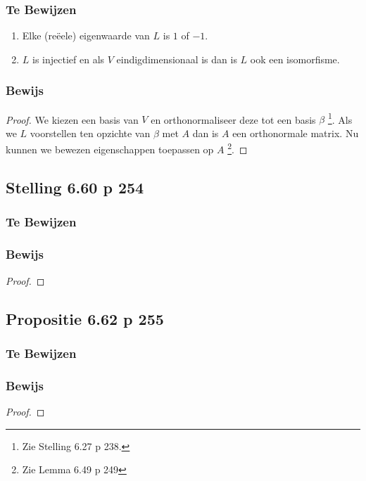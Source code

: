 \documentclass[lineaire_algebra_oplossingen.tex]{subfiles}
\begin{document}
\subsubsection*{Te Bewijzen}
\begin{enumerate}
\item Elke (re\"eele) eigenwaarde van $L$ is $1$ of $-1$.
\item $L$ is injectief en als $V$ eindigdimensionaal is dan is $L$ ook een isomorfisme.
\end{enumerate}
\subsubsection*{Bewijs}
\begin{proof}
We kiezen een basis van $V$ en orthonormaliseer deze tot een basis $\beta$ \footnote{Zie Stelling 6.27 p 238.}. Als we $L$ voorstellen ten opzichte van $\beta$ met $A$ dan is $A$ een orthonormale matrix.
Nu kunnen we bewezen eigenschappen toepassen op $A$ \footnote{Zie Lemma 6.49 p 249}.
\end{proof}

\subsection{Stelling 6.60 p 254}
\subsubsection*{Te Bewijzen}
\subsubsection*{Bewijs}
\begin{proof}

\end{proof}

\subsection{Propositie 6.62 p 255}
\subsubsection*{Te Bewijzen}
\subsubsection*{Bewijs}
\begin{proof}

\end{proof}
\end{document}

